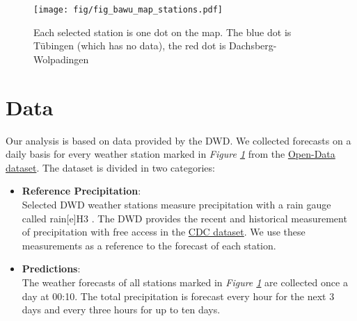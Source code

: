 \documentclass{article}
\theoremstyle{plain}
\theoremstyle{definition}
\theoremstyle{remark}
\begin{document}

\begin{figure}[h]
    \centering
    \label{fig:bw-stations}
    \texttt{[image: fig/fig\_bawu\_map\_stations.pdf]}
    \caption{Each selected station is one dot on the map. The blue dot is
        Tübingen (which has no data), the red dot is Dachsberg-Wolpadingen}
\end{figure}

\section{Data}\label{sec:Data}
Our analysis is based on data provided by the DWD. We collected forecasts on a
daily basis for every weather station marked in \textit{Figure
    \ref{fig:bw-stations}} from the
\href{https://opendata.dwd.de/climate_environment/CDC/}{Open-Data dataset}. The
dataset is divided in two categories:
\begin{itemize}
    \item \textbf{Reference Precipitation}:\\
          Selected DWD weather stations measure precipitation with a rain gauge
          called rain[e]H3 \cite{rain-e}. The DWD provides the recent and historical
          measurement of precipitation with free access in the
          \href{https://opendata.dwd.de/climate_environment/CDC/observations_germany/climate/hourly/precipitation/}{CDC
              dataset}. We use these measurements as a reference to the forecast of each
          station.

    \item \textbf{Predictions}:\\
          The weather forecasts of all stations marked in \textit{Figure
              \ref{fig:bw-stations}} are collected once a day at 00:10. The total
          precipitation is forecast every hour for the next 3 days and every three hours
          for up to ten days.
\end{itemize}
\end{document}
